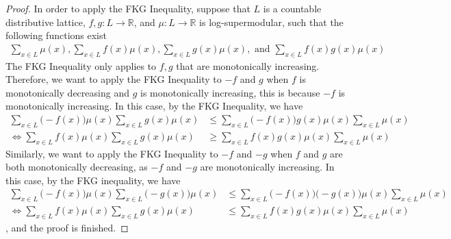 \begin{proof}
  In order to apply the FKG Inequality, suppose that $L$ is a countable distributive lattice, $f,g: L \to \mathbb{R}$, and $\mu : L \to \mathbb{R}$ is log-supermodular, such that the following functions exist
  \begin{align*}
    \sum\limits_{x \in L}\mu(x), \sum\limits_{x \in L}f(x)\mu(x), \sum\limits_{x \in L}g(x)\mu(x), \text{ and } \sum\limits_{x \in L}f(x)g(x)\mu(x)
  \end{align*}
  The FKG Inequality only applies to $f,g$ that are monotonically increasing. Therefore, we want to apply the FKG Inequality to $-f$ and $g$ when $f$ is monotonically decreasing and $g$ is monotonically increasing, this is because $-f$ is monotonically increasing. In this case, by the FKG Inequality, we have
  \begin{align*}
    \sum\limits_{x \in L} \Big(-f(x)\Big)\mu(x) \sum\limits_{x \in L}g(x)\mu(x) &\leq \sum\limits_{x \in L} \Big(-f(x)\Big)g(x)\mu(x) \sum\limits_{x \in L} \mu(x) \\
    \Leftrightarrow \sum\limits_{x \in L}f(x)\mu(x) \sum\limits_{x \in L}g(x)\mu(x) &\geq \sum\limits_{x \in L}f(x)g(x)\mu(x) \sum\limits_{x \in L} \mu(x)
  \end{align*}
  Similarly, we want to apply the FKG Inequality to $-f$ and $-g$ when $f$ and $g$ are both monotonically decreasing, as $-f$ and $-g$ are monotonically increasing. In this case, by the FKG inequality, we have
  \begin{align*}
    \sum\limits_{x \in L} \Big(-f(x)\Big)\mu(x) \sum\limits_{x \in L} \Big(-g(x)\Big)\mu(x) &\leq \sum\limits_{x \in L} \Big(-f(x) \Big) \Big( -g(x) \Big) \mu(x) \sum\limits_{x \in L} \mu(x) \\
    \Leftrightarrow \sum\limits_{x \in L}f(x)\mu(x) \sum\limits_{x \in L}g(x)\mu(x) &\leq \sum\limits_{x \in L}f(x)g(x)\mu(x) \sum\limits_{x \in L} \mu(x)
  \end{align*}
  , and the proof is finished.
\end{proof}

